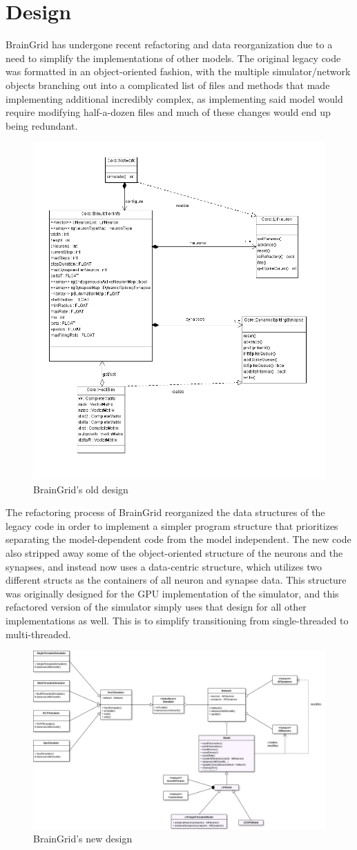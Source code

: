 \section{Design} \mdseries 
BrainGrid has undergone recent refactoring and data reorganization due to a need to simplify the implementations of other models. The original legacy code was formatted in an object-oriented fashion, with the multiple simulator/network objects branching out into a complicated list of files and methods that made implementing additional incredibly complex, as implementing said model would require modifying half-a-dozen files and much of these changes would end up being redundant. 
\begin{figure}
	\centering
		\includegraphics[width=.6\textwidth]{./diagrams/OldDiagram.png}
		\caption{BrainGrid's old design}
\end{figure}
\pagebreak

\noindent \mdseries The refactoring process of BrainGrid reorganized the data structures of the legacy code in order to implement a simpler program structure that prioritizes separating the model-dependent code from the model independent. The new code also stripped away some of the object-oriented structure of the neurons and the synapses, and instead now uses a data-centric structure, which utilizes two different structs as the containers of all neuron and synapse data. This structure was originally designed for the GPU implementation of the simulator, and this refactored version of the simulator simply uses that design for all other implementations as well. This is to simplify transitioning from single-threaded to multi-threaded.

\begin{figure}
	\centering
		\includegraphics[width=\textwidth]{./diagrams/NewDiagram.png}
		\caption{BrainGrid's new design}
\end{figure}
\pagebreak
